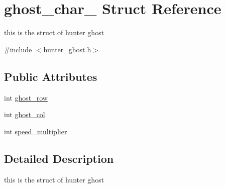 \hypertarget{structghost__char__2}{\section{ghost\-\_\-char\-\_ Struct Reference}
\label{structghost__char__2}
}


this is the struct of hunter ghost  




{\ttfamily \#include $<$hunter\-\_\-ghost.\-h$>$}

\subsection*{Public Attributes}
\begin{DoxyCompactItemize}
\item 
int \hyperlink{structghost__char__2_a20d27159bd360d3caba98c961defec53}{ghost\-\_\-row}
\item 
int \hyperlink{structghost__char__2_ac4e881e8acd28d1ba0157a7700a625f2}{ghost\-\_\-col}
\item 
int \hyperlink{structghost__char__2_a656d3a3b2495e63e6f4a7f751cc0fea4}{speed\-\_\-multiplier}
\end{DoxyCompactItemize}


\subsection{Detailed Description}
this is the struct of hunter ghost 

